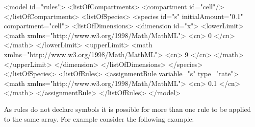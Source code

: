 \documentclass{cekarticle}
\begin{document}
\begin{example}
<model id="rules">
    <listOfCompartments>
        <compartment id="cell"/>
    </listOfCompartments>
    <listOfSpecies>
        <species id="s" initialAmount="0.1" compartment="cell">
            <listOfDimensions>
                <dimension id="x">
                    <lowerLimit>
                        <math xmlns="http://www.w3.org/1998/Math/MathML">
                            <cn> 0 </cn>
                        </math>
                    </lowerLimit>
                    <upperLimit>
                        <math xmlns="http://www.w3.org/1998/Math/MathML">
                            <cn> 9 </cn>
                        </math>
                    </upperLimit>
                </dimension>
            </listOfDimensions>
        </species>
    </listOfSpecies>
    <listOfRules>
        <assignmentRule variable="s" type="rate">
            <math xmlns="http://www.w3.org/1998/Math/MathML">
                <cn> 0.1 </cn>
            </math>
        </assignmentRule>
    </listOfRules>
</model>
\end{example}

As rules do not declare symbols it is possible for more than one
rule to be applied to the same array. For example consider the
following example:
\end{document}
